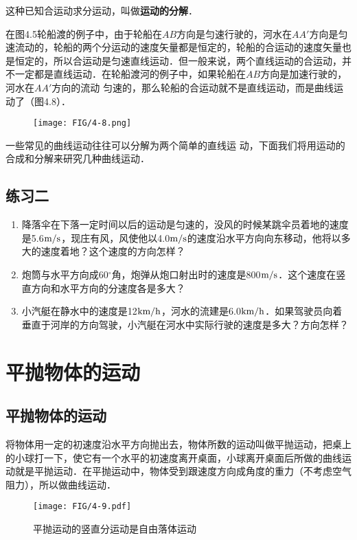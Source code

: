 这种已知合运动求分运动，叫做\textbf{运动的分解}．

在图4.5轮船渡的例子中，由于轮船在$AB$方向是匀速行驶的，河水在$AA'$方向是匀速流动的，轮船的两个分运动的速度矢量都是恒定的，轮船的合运动的速度矢量也是恒定的，所以合运动是匀速直线运动．但一般来说，两个直线运动的合运动，并不一定都是直线运动．在轮船渡河的例子中，如果轮船在$AB$方向是加速行驶的，河水在$AA'$方向的流动
匀速的，那么轮船的合运动就不是直线运动，而是曲线运动了（图4.8）．

\begin{figure}[htp]
    \centering
    \texttt{[image: FIG/4-8.png]}
    \caption{}
    \end{figure}

一些常见的曲线运动往往可以分解为两个简单的直线运
动，下面我们将用运动的合成和分解来研究几种曲线运动．

\subsection*{练习二}
\begin{enumerate}
	\item 降落伞在下落一定时间以后的运动是匀速的，没风的时候某跳伞员着地的速度是5.6$\text{m}/\text{s}$，现庄有风，风使他以4.0$\text{m}/\text{s}$的速度沿水平方向向东移动，他将以多大的速度着地？这个速度的方向怎样？
\item 炮筒与水平方向成60$^\circ$角，炮弹从炮口射出时的速度是800$\text{m}/\text{s}$．这个速度在竖直方向和水平方向的分速度各是多大？
\item 小汽艇在静水中的速度是12$\text{km}/\text{h}$，河水的流建是6.0$\text{km}/\text{h}$．如果驾驶员向着垂直于河岸的方向驾驶，小汽艇在河水中实际行驶的速度是多大？方向怎样？
\end{enumerate}


\section{平抛物体的运动}
\subsection{平抛物体的运动} 

将物体用一定的初速度沿水平方向抛出去，物体所数的运动叫做平抛运动，把桌上的小球打一下，使它有一个水平的初速度离开桌面，小球离开桌面后所做的曲线运动就是平抛运动．在平抛运动中，物体受到跟速度方向成角度的重力（不考虑空气阻力），所以做曲线运动．

\begin{figure}[htp]
    \centering
    \texttt{[image: FIG/4-9.pdf]}
    \caption{平抛运动的竖直分运动是自由落体运动}
    \end{figure}

